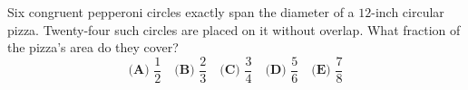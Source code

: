Six congruent pepperoni circles exactly span the diameter of a $12$-inch circular pizza. Twenty-four such circles are placed on it without overlap. What fraction of the pizza's area do they cover?
\[\textbf{(A) }\dfrac{1}{2}\quad\textbf{(B) }\dfrac{2}{3}\quad\textbf{(C) }\dfrac{3}{4}\quad\textbf{(D) }\dfrac{5}{6}\quad\textbf{(E) }\dfrac{7}{8}\]
